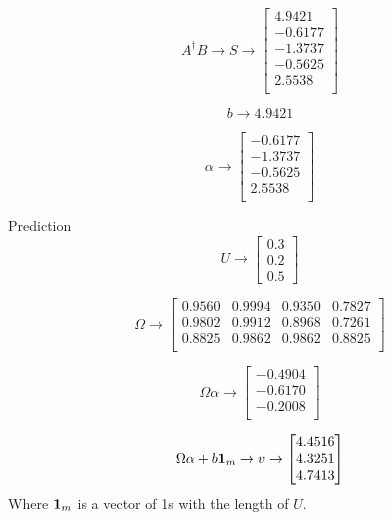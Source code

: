 \begin{equation}
  A^{\dag}B\to S\to
  \begin{bmatrix}
    4.9421  \\
    -0.6177 \\
    -1.3737 \\
    -0.5625 \\
    2.5538  \\
  \end{bmatrix}
\end{equation}

\begin{equation}
  b\to 4.9421
\end{equation}

\begin{equation}
  \alpha \to
  \begin{bmatrix}
    -0.6177 \\
    -1.3737 \\
    -0.5625 \\
    2.5538  \\
  \end{bmatrix}
\end{equation}

Prediction
\begin{equation}
  U\to
  \begin{bmatrix}
    0.3 \\
    0.2 \\
    0.5
  \end{bmatrix}
\end{equation}

\begin{equation}
  \Omega\to
  \begin{bmatrix}
    0.9560 & 0.9994 & 0.9350 & 0.7827 \\
    0.9802 & 0.9912 & 0.8968 & 0.7261 \\
    0.8825 & 0.9862 & 0.9862 & 0.8825 \\
  \end{bmatrix}
\end{equation}

\begin{equation}
  \Omega\alpha\to
  \begin{bmatrix}
    -0.4904 \\
    -0.6170 \\
    -0.2008 \\
  \end{bmatrix}
\end{equation}

\begin{equation}
  \Omega\alpha+b\vb{1}_{m}\to v\to
  \begin{bmatrix}
    4.4516 \\
    4.3251 \\
    4.7413 \\
  \end{bmatrix}
\end{equation}
Where \(\vb{1}_{m}\) is a vector of 1s with the length of \(U\).

